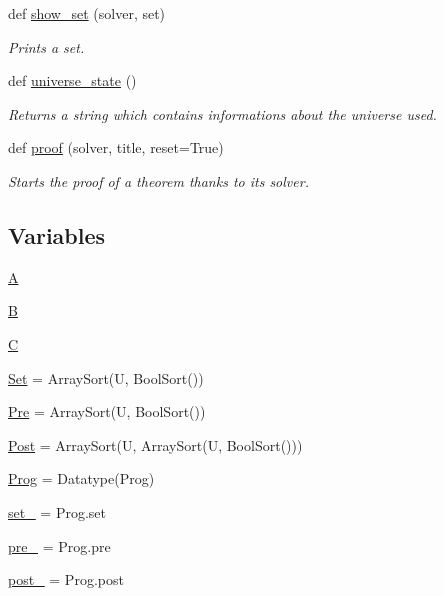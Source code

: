 \begin{DoxyCompactItemize}
def \hyperlink{namespacemeyer_1_1program_a4dd6b1d1b136379bcee2fa37a407eff9}{show\+\_\+set} (solver, set)
\begin{DoxyCompactList}\small\item\em Prints a set. \end{DoxyCompactList}\item 
def \hyperlink{namespacemeyer_1_1program_a48c262752e496209621f5c6e0da3f8ad}{universe\+\_\+state} ()
\begin{DoxyCompactList}\small\item\em Returns a string which contains informations about the universe used. \end{DoxyCompactList}\item 
def \hyperlink{namespacemeyer_1_1program_a1f3d5951c7b4c6aad277761ba776724b}{proof} (solver, title, reset=True)
\begin{DoxyCompactList}\small\item\em Starts the proof of a theorem thanks to its solver. \end{DoxyCompactList}\end{DoxyCompactItemize}
\subsection*{Variables}
\begin{DoxyCompactItemize}
\item 
\hyperlink{namespacemeyer_1_1program_a5439166d754be3dc1dd22114889f26f2}{A}
\item 
\hyperlink{namespacemeyer_1_1program_ac206af55b2b0d02e01c488d77a0830e7}{B}
\item 
\hyperlink{namespacemeyer_1_1program_afa493796575f275536829e18ce904c1d}{C}
\item 
\hyperlink{namespacemeyer_1_1program_ac9c465b4f9426d61a87d653e9f26dc36}{Set} = Array\+Sort(U, Bool\+Sort())
\item 
\hyperlink{namespacemeyer_1_1program_a18582ffc9743be82070d174cf1dd0def}{Pre} = Array\+Sort(U, Bool\+Sort())
\item 
\hyperlink{namespacemeyer_1_1program_a18877460818246ee839f29d7e6dc5eed}{Post} = Array\+Sort(U, Array\+Sort(U, Bool\+Sort()))
\item 
\hyperlink{namespacemeyer_1_1program_a314c908a305b7a9bf8e7bc6b9cde2e02}{Prog} = Datatype(\textquotesingle{}Prog\textquotesingle{})
\item 
\hyperlink{namespacemeyer_1_1program_aa5506eff84f20ed482dae9ad8b143b22}{set\+\_\+} = Prog.\+set
\item 
\hyperlink{namespacemeyer_1_1program_a6f2f5087d48ccd14f64219bc08379388}{pre\+\_\+} = Prog.\+pre
\item 
\hyperlink{namespacemeyer_1_1program_a3222d9981c3064528ea694bbadf9c67a}{post\+\_\+} = Prog.\+post
\end{DoxyCompactItemize}



